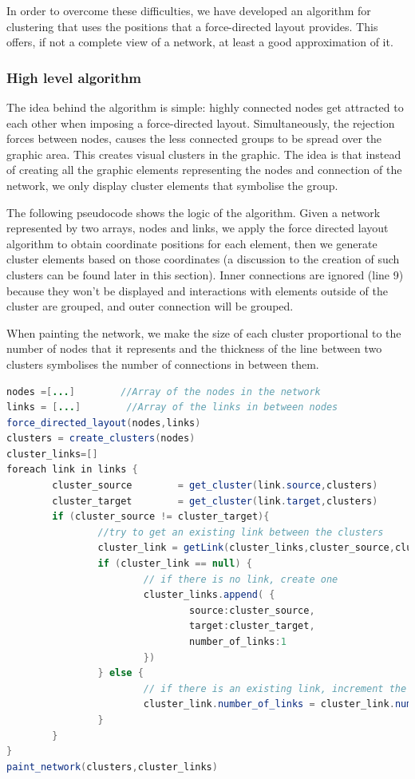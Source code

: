 In order to overcome these difficulties, we have developed an algorithm for clustering that uses the positions that a force-directed layout provides. This offers, if not a complete view of a network, at least a good approximation of it.

\subsubsection{High level algorithm}
The idea behind the algorithm is simple: highly connected nodes get attracted to each other when imposing a force-directed layout. Simultaneously, the rejection forces between nodes, causes the less connected groups to be spread over the graphic area. This creates visual clusters in the graphic. The idea is that instead of creating all the graphic elements representing the nodes and connection of the network, we only display cluster elements that symbolise the group.

The following pseudocode shows the logic of the algorithm. Given a network represented by two arrays, nodes and links, we apply the force directed layout algorithm to obtain coordinate positions for each element, then we generate cluster elements based on those coordinates (a discussion to the creation of such clusters can be found later in this section). Inner connections are ignored (line 9) because they won't be displayed and interactions with elements outside of the cluster are grouped,  and outer connection will be grouped.

When painting the network, we make the size of each cluster proportional to the number of nodes that it represents and the thickness of the line between two clusters symbolises the number of connections in between them.

\begin{lstlisting}[language=java]%,float,floatplacement=H]
nodes =[...]        //Array of the nodes in the network
links = [...]        //Array of the links in between nodes
force_directed_layout(nodes,links) 
clusters = create_clusters(nodes)
cluster_links=[]
foreach link in links {
        cluster_source        = get_cluster(link.source,clusters)
        cluster_target        = get_cluster(link.target,clusters)
        if (cluster_source != cluster_target){
                //try to get an existing link between the clusters
                cluster_link = getLink(cluster_links,cluster_source,cluster_target) 
                if (cluster_link == null) {
                        // if there is no link, create one
                        cluster_links.append( {
                                source:cluster_source, 
                                target:cluster_target, 
                                number_of_links:1
                        })
                } else {
                        // if there is an existing link, increment the number of links between the clusters
                        cluster_link.number_of_links = cluster_link.number_of_links +1
                }
        }
}
paint_network(clusters,cluster_links)
\end{lstlisting}

